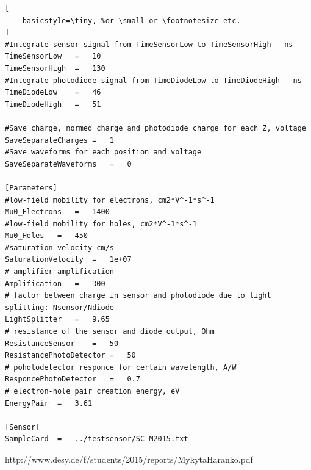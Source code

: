\documentclass[12pt,oneside,notitlepage,abstracton,a4paper]{scrartcl}
\begin{document}
\begin{lstlisting}[
    basicstyle=\tiny, %or \small or \footnotesize etc.
]
#Integrate sensor signal from TimeSensorLow to TimeSensorHigh - ns
TimeSensorLow	=	10
TimeSensorHigh	=	130
#Integrate photodiode signal from TimeDiodeLow to TimeDiodeHigh - ns
TimeDiodeLow	=	46
TimeDiodeHigh	=	51

#Save charge, normed charge and photodiode charge for each Z, voltage
SaveSeparateCharges	=	1
#Save waveforms for each position and voltage
SaveSeparateWaveforms	=	0

[Parameters]
#low-field mobility for electrons, cm2*V^-1*s^-1
Mu0_Electrons	=	1400
#low-field mobility for holes, cm2*V^-1*s^-1
Mu0_Holes	=	450
#saturation velocity cm/s
SaturationVelocity	=	1e+07
# amplifier amplification
Amplification	=	300
# factor between charge in sensor and photodiode due to light splitting: Nsensor/Ndiode
LightSplitter	=	9.65
# resistance of the sensor and diode output, Ohm
ResistanceSensor	=	50
ResistancePhotoDetector	=	50
# pohotodetector responce for certain wavelength, A/W
ResponcePhotoDetector	=	0.7
# electron-hole pair creation energy, eV
EnergyPair	=	3.61

[Sensor]
SampleCard	=	../testsensor/SC_M2015.txt
\end{lstlisting}

\clearpage

\begin{thebibliography}{99}
\begin{sloppypar}
 http://www.desy.de/f/students/2015/reports/MykytaHaranko.pdf
\end{sloppypar}
\end{thebibliography}
\end{document}
